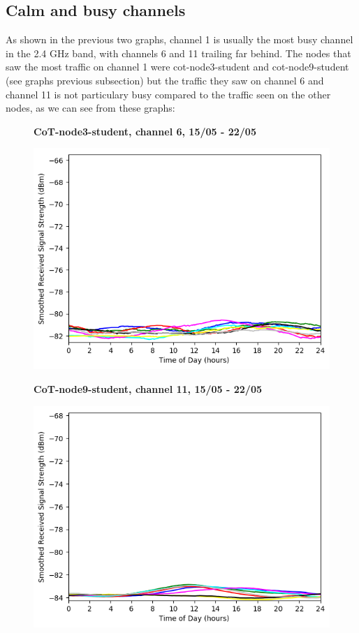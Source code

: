 \documentclass[a4paper, 11pt]{article}
\begin{document}
\subsection{Calm and busy channels}
As shown in the previous two graphs, channel 1 is usually the most busy channel in the 2.4 GHz band, with channels 6 and 11 trailing far behind. The nodes that saw the most traffic on channel 1 were cot-node3-student and cot-node9-student (see graphs previous subsection) but the traffic they saw on channel 6 and channel 11 is not particulary busy compared to the traffic seen on the other nodes, as we can see from these graphs:\\
\begin{figure}[h!]
    \centering
    \textbf{CoT-node3-student, channel 6, 15/05 - 22/05}\par\medskip
	\includegraphics[scale=0.5]{images/2_4_GHz/cot-node3-student_2017-05-22_chan6_image.png}
\end{figure}
\begin{figure}[h!]
    \centering
    \textbf{CoT-node9-student, channel 11, 15/05 - 22/05}\par\medskip
	\includegraphics[scale=0.5]{images/2_4_GHz/cot-node9-student_2017-05-22_chan11_image.png}
\end{figure}
\end{document}
